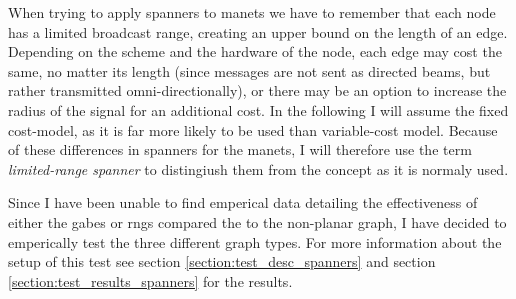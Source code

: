 When trying to apply spanners to \acp{manet} we have to remember that each node has a limited broadcast range, creating an upper bound on the length of an edge. Depending on the scheme and the hardware of the node, each edge may cost the same, no matter its length (since messages are not sent as directed beams, but rather transmitted omni-directionally), or there may be an option to increase the radius of the signal for an additional cost. In the following I will assume the fixed cost-model, as it is far more likely to be used than variable-cost model. Because of these differences in spanners for the \acp{manet}, I will therefore use the term \emph{limited-range spanner} to distingiush them from the concept as it is normaly used. 


Since I have been unable to find emperical data detailing the effectiveness of either the \acp{gabe} or \acp{rng} compared the to the non-planar graph, I have decided to emperically test the three different graph types. For more information about the setup of this test see section \ref{section:test_desc_spanners} and section \ref{section:test_results_spanners} for the results.




